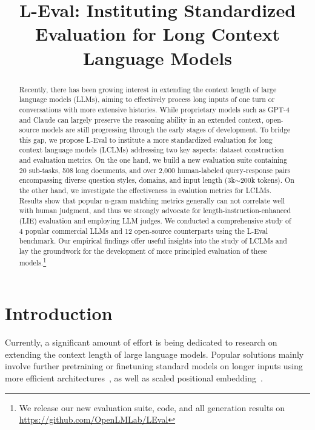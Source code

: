 \title{L-Eval: Instituting Standardized Evaluation for Long Context Language Models}



\maketitle

\begin{abstract}
Recently, there has been growing interest in extending the context length of large language models (LLMs), aiming to effectively process long inputs of one turn or conversations with more extensive histories. While proprietary models such as GPT-4 and Claude can largely preserve the reasoning ability in an extended context, open-source models are still progressing through the early stages of development. 
To bridge this gap, we propose L-Eval to institute a more standardized evaluation for long context language models (LCLMs) addressing two key aspects: dataset construction and evaluation metrics. On the one hand, we build a new evaluation suite containing 20 sub-tasks, 508 long documents, and over 2,000 human-labeled query-response pairs encompassing diverse question styles, domains, and input length (3k$\sim$200k tokens). On the other hand, we investigate the effectiveness in evalution metrics for LCLMs. Results show that popular n-gram matching metrics generally can not correlate well with human judgment, and thus we strongly advocate for length-instruction-enhanced (LIE) evaluation and employing LLM judges.  We conducted a comprehensive study of 4 popular commercial LLMs and 12 open-source counterparts using the L-Eval benchmark. Our empirical findings offer useful insights into the study of LCLMs and lay the groundwork for the development of more principled evaluation of these models.\footnote{We release our new evaluation suite, code, and all generation results on  \url{https://github.com/OpenLMLab/LEval}}

\end{abstract}

\section{Introduction}
Currently, a significant amount of effort is being dedicated to research on extending the context length of large language models. Popular solutions mainly involve further pretraining or finetuning standard models on longer inputs using more efficient architectures~\citep{ding2023longnet, NEURIPS2022_67d57c32, liang2023unleashing, mohtashami2023landmark, li2023incontext}, as well as scaled positional embedding~\citep{su2022roformer, sun2022lengthextrapolatable, fixedNTK, qin2023linear}. 

